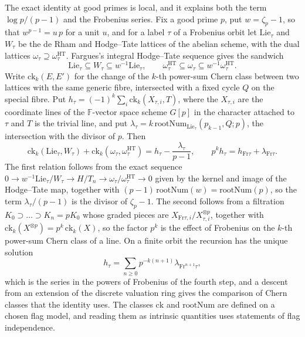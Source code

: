\documentclass[11pt,letterpaper]{article}
\numberwithin{equation}{section}
\begin{document}
The exact identity at good primes is local, and it explains both the term $\log p/(p-1)$ and the Frobenius series. Fix a good prime $p$, put $w=\zeta_p-1$, so that $w^{p-1}=u\,p$ for a unit $u$, and for a label $\tau$ of a Frobenius orbit let $\mathrm{Lie}_\tau$ and $W_\tau$ be the de Rham and Hodge--Tate lattices of the abelian scheme, with the dual lattices $\omega_\tau\supseteq\omega^{\mathrm{HT}}_\tau$. Fargues's integral Hodge--Tate sequence gives the sandwich
\[
\mathrm{Lie}_\tau\subseteq W_\tau\subseteq w^{-1}\mathrm{Lie}_\tau,\qquad \omega^{\mathrm{HT}}_\tau\subseteq\omega_\tau\subseteq w^{-1}\omega^{\mathrm{HT}}_\tau .
\]
Write $\mathrm{ck}_k(E,E')$ for the change of the $k$-th power-sum Chern class between two lattices with the same generic fibre, intersected with a fixed cycle $Q$ on the special fibre. Put $h_\tau=(-1)^k\sum_i\mathrm{ck}_k(X_{\tau,i},T)$, where the $X_{\tau,i}$ are the coordinate lines of the $\mathbb F$-vector space scheme $G[p]$ in the character attached to $\tau$ and $T$ is the trivial line, and put $\lambda_\tau=k\,\mathrm{rootNum}_{\mathrm{Lie}_\tau}(p_{k-1},Q;p)$, the intersection with the divisor of $p$. Then
\[
\mathrm{ck}_k(\mathrm{Lie}_\tau,W_\tau)+\mathrm{ck}_k(\omega_\tau,\omega^{\mathrm{HT}}_\tau)=h_\tau-\frac{\lambda_\tau}{p-1},\qquad p^kh_\tau=h_{\mathrm{Fr}\tau}+\lambda_{\mathrm{Fr}\tau}.
\]
The first relation follows from the exact sequence $0\to w^{-1}\mathrm{Lie}_\tau/W_\tau\to H/T_n\to\omega_\tau/\omega^{\mathrm{HT}}_\tau\to0$ given by the kernel and image of the Hodge--Tate map, together with $(p-1)\,\mathrm{rootNum}(w)=\mathrm{rootNum}(p)$, so the term $\lambda_\tau/(p-1)$ is the divisor of $\zeta_p-1$. The second follows from a filtration $K_0\supset\dots\supset K_n=pK_0$ whose graded pieces are $X_{\mathrm{Fr}\tau,i}/X_{\tau,i}^{\otimes p}$, together with $\mathrm{ck}_k(X^{\otimes p})=p^k\,\mathrm{ck}_k(X)$, so the factor $p^k$ is the effect of Frobenius on the $k$-th power-sum Chern class of a line. On a finite orbit the recursion has the unique solution
\[
h_\tau=\sum_{n\ge0}p^{-k(n+1)}\lambda_{\mathrm{Fr}^{n+1}\tau},
\]
which is the series in the powers of Frobenius of the fourth step, and a descent from an extension of the discrete valuation ring gives the comparison of Chern classes that the identity uses. The classes $\mathrm{ck}$ and $\mathrm{rootNum}$ are defined on a chosen flag model, and reading them as intrinsic quantities uses statements of flag independence.
\end{document}
